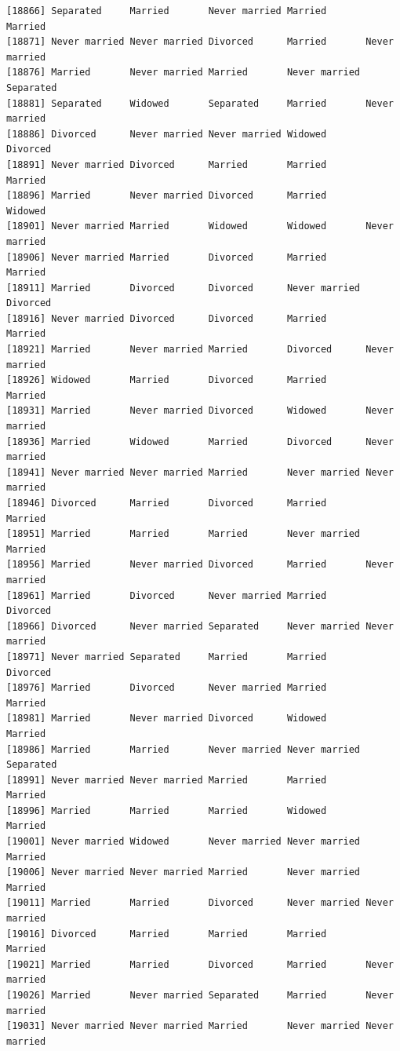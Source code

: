\documentclass[
  letterpaper,
  DIV=11,
  numbers=noendperiod,
  oneside]{scrartcl}
\begin{document}
\begin{verbatim}
[18866] Separated     Married       Never married Married       Married      
[18871] Never married Never married Divorced      Married       Never married
[18876] Married       Never married Married       Never married Separated    
[18881] Separated     Widowed       Separated     Married       Never married
[18886] Divorced      Never married Never married Widowed       Divorced     
[18891] Never married Divorced      Married       Married       Married      
[18896] Married       Never married Divorced      Married       Widowed      
[18901] Never married Married       Widowed       Widowed       Never married
[18906] Never married Married       Divorced      Married       Married      
[18911] Married       Divorced      Divorced      Never married Divorced     
[18916] Never married Divorced      Divorced      Married       Married      
[18921] Married       Never married Married       Divorced      Never married
[18926] Widowed       Married       Divorced      Married       Married      
[18931] Married       Never married Divorced      Widowed       Never married
[18936] Married       Widowed       Married       Divorced      Never married
[18941] Never married Never married Married       Never married Never married
[18946] Divorced      Married       Divorced      Married       Married      
[18951] Married       Married       Married       Never married Married      
[18956] Married       Never married Divorced      Married       Never married
[18961] Married       Divorced      Never married Married       Divorced     
[18966] Divorced      Never married Separated     Never married Never married
[18971] Never married Separated     Married       Married       Divorced     
[18976] Married       Divorced      Never married Married       Married      
[18981] Married       Never married Divorced      Widowed       Married      
[18986] Married       Married       Never married Never married Separated    
[18991] Never married Never married Married       Married       Married      
[18996] Married       Married       Married       Widowed       Married      
[19001] Never married Widowed       Never married Never married Married      
[19006] Never married Never married Married       Never married Married      
[19011] Married       Married       Divorced      Never married Never married
[19016] Divorced      Married       Married       Married       Married      
[19021] Married       Married       Divorced      Married       Never married
[19026] Married       Never married Separated     Married       Never married
[19031] Never married Never married Married       Never married Never married

\end{verbatim}
\end{document}
